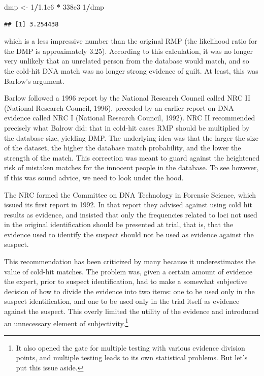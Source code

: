\documentclass[10pt,dvipsnames,enabledeprecatedfontcommands]{scrartcl}
\newenvironment{Shaded}{\begin{snugshade}}{\end{snugshade}}
\newcommand{\DecValTok}[1]{\textcolor[rgb]{0.00,0.00,0.81}{#1}}
\newcommand{\FloatTok}[1]{\textcolor[rgb]{0.00,0.00,0.81}{#1}}
\newcommand{\StringTok}[1]{\textcolor[rgb]{0.31,0.60,0.02}{#1}}
\newcommand{\OperatorTok}[1]{\textcolor[rgb]{0.81,0.36,0.00}{\textbf{#1}}}
\newcommand{\NormalTok}[1]{#1}
\begin{document}

\begin{Shaded}
\begin{Highlighting}[]
\NormalTok{dmp <-}\StringTok{ }\DecValTok{1}\OperatorTok{/}\FloatTok{1.1e6} \OperatorTok{*}\StringTok{ }\FloatTok{338e3}
\DecValTok{1}\OperatorTok{/}\NormalTok{dmp}
\end{Highlighting}
\end{Shaded}

\begin{verbatim}
## [1] 3.254438
\end{verbatim}

\noindent which is a less impressive number than the original RMP (the
likelihood ratio for the DMP is approximately 3.25). According to this
calculation, it was no longer very unlikely that an unrelated person
from the database would match, and so the cold-hit DNA match was no
longer strong evidence of guilt. At least, this was Barlow's argument.

Barlow followed a 1996 report by the National Research Council called
NRC II (National Research Council, 1996), preceded by an earlier report
on DNA evidence called NRC I (National Research Council, 1992). NRC II
recommended precisely what Balrow did: that in cold-hit cases RMP should
be multiplied by the database size, yielding DMP. The underlying idea
was that the larger the size of the dataset, the higher the database
match probability, and the lower the strength of the match. This
correction was meant to guard against the heightened risk of mistaken
matches for the innocent people in the database. To see however, if this
was sound advice, we need to look under the hood.

The NRC formed the Committee on DNA Technology in Forensic Science,
which issued its first report in 1992. In that report they advised
against using cold hit results as evidence, and insisted that only the
frequencies related to loci not used in the original identification
should be presented at trial, that is, that the evidence used to
identify the suspect should not be used as evidence against the suspect.

This recommendation has been criticized by many because it
underestimates the value of cold-hit matches. The problem was, given a
certain amount of evidence the expert, prior to suspect identification,
had to make a somewhat subjective decision of how to divide the evidence
into two items: one to be used only in the suspect identification, and
one to be used only in the trial itself as evidence against the suspect.
This overly limited the utility of the evidence and introduced an
unnecessary element of
subjectivity.\footnote{It also opened the gate for multiple testing with various evidence division points, and multiple testing leads to its own statistical problems. But let's put this issue aside.}
\end{document}
